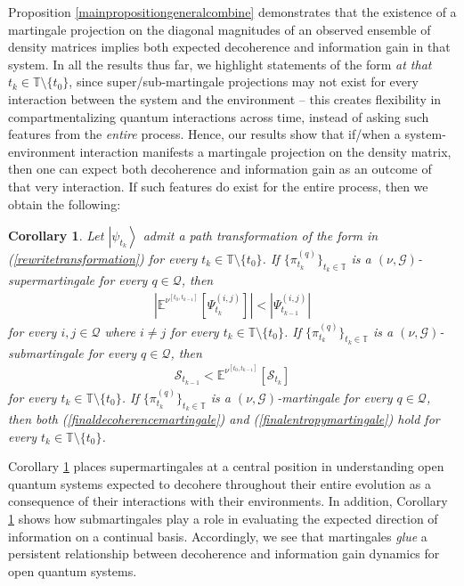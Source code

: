 \documentclass[12pt,a4paper]{article}
\newtheorem{coro}[thm]{Corollary}
\def\T{\mathbb{T}}
\def\G{\mathscr{G}}
\begin{document}
Proposition \ref{mainpropositiongeneralcombine} demonstrates that the existence of a martingale projection on the diagonal magnitudes of an observed ensemble of density matrices implies both expected decoherence and information gain in that system. In all the results thus far, we highlight statements of the form \emph{at that $t_k\in\T\setminus\{t_0\}$}, since super/sub-martingale projections may not exist for every interaction between the system and the environment -- this creates flexibility in compartmentalizing quantum interactions across time, instead of asking such features from the \emph{entire} process. 
Hence, our results show that if/when a system-environment interaction manifests a martingale projection on the density matrix, then one can expect both decoherence and information gain as an outcome of that very interaction. If such features do exist for the entire process, then we obtain the following:
\begin{coro}
\label{martingalestatement}
Let $\left|\psi_{t_{k}}\right\rangle$ admit a path transformation of the form in {\rm (\ref{rewritetransformation})} for every $t_k\in\T\setminus\{t_0\}$. If $\{\pi^{(q)}_{t_{k}}\}_{t_k\in\T}$ is a $(\nu,\G)$-supermartingale for every $q\in\mathcal{Q}$, then
\begin{align}
\left| \mathbb{E}^{\nu^{[t_{0},t_{k-1}]}}\left[\Psi_{t_{k}}^{(i,j)}\right] \right| < \left| \Psi_{t_{k-1}}^{(i,j)} \right| \label{finaldecoherencemartingale}
\end{align}
for every $i,j\in\mathcal{Q}$ where $i\neq j$ for every $t_k\in\T\setminus\{t_0\}$. If $\{\pi^{(q)}_{t_{k}}\}_{t_k\in\T}$ is a $(\nu,\G)$-submartingale for every $q\in\mathcal{Q}$, then 
\begin{align}
\mathcal{S}_{t_{k-1}} < \mathbb{E}^{\nu^{[t_{0},t_{k-1}]}}\left[\mathcal{S}_{t_{k}}\right] \label{finalentropymartingale}
\end{align}
for every $t_k\in\T\setminus\{t_0\}$. If $\{\pi^{(q)}_{t_{k}}\}_{t_k\in\T}$ is a $(\nu,\G)$-martingale for every $q\in\mathcal{Q}$, then both {\rm (\ref{finaldecoherencemartingale})} and {\rm (\ref{finalentropymartingale})} hold for every $t_k\in\T\setminus\{t_0\}$.
\end{coro}
Corollary \ref{martingalestatement} places supermartingales at a central position in understanding open quantum systems expected to decohere throughout their entire evolution as a consequence of their interactions with their environments. In addition, Corollary \ref{martingalestatement} shows how submartingales play a role in evaluating the expected direction of information on a continual basis. Accordingly, we see that martingales \emph{glue} a persistent relationship between decoherence and information gain dynamics for open quantum systems. 
\end{document}
